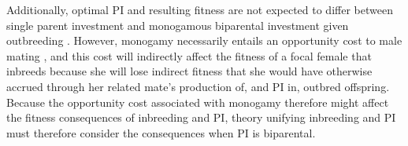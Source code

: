 \documentclass[12pt]{article}
\begin{document}
Additionally, optimal PI and resulting fitness are not expected to differ between single parent investment and monogamous biparental investment given outbreeding \cite[][]{Parker1985}. However, monogamy necessarily entails an opportunity cost to male mating \cite[][]{Waser1986}, and this cost will indirectly affect the fitness of a focal female that inbreeds because she will lose indirect fitness that she would have otherwise accrued through her related mate's production of, and PI in, outbred offspring. Because the opportunity cost associated with monogamy therefore might affect the fitness consequences of inbreeding and PI, theory unifying inbreeding and PI must therefore consider the consequences when PI is biparental.
\end{document}
